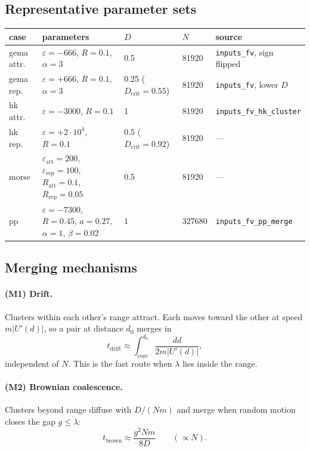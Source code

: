 \documentclass[11pt]{article}
\newcommand{\code}[1]{\texttt{#1}}
\begin{document}
\subsection{Representative parameter sets}\label{sec:params}
\begin{center}
\begin{tabularx}{\textwidth}{@{}l L l l L@{}}
\toprule
case & parameters & $D$ & $N$ & source \\
\midrule
gema attr. & $\varepsilon=-666$, $R=0.1$, $\alpha=3$ & 0.5 & 81920 & \code{inputs\_fv}, sign flipped \\
gema rep. & $\varepsilon=+666$, $R=0.1$, $\alpha=3$ & 0.25 ($D_{\mathrm{crit}}=0.55$) & 81920 & \code{inputs\_fv}, lower $D$ \\
hk attr. & $\varepsilon=-3000$, $R=0.1$ & 1 & 81920 & \code{inputs\_fv\_hk\_cluster} \\
hk rep. & $\varepsilon=+2\cdot10^4$, $R=0.1$ & 0.5 ($D_{\mathrm{crit}}=0.92$) & 81920 & --- \\
morse & $\varepsilon_{\mathrm{att}}=200$, $\varepsilon_{\mathrm{rep}}=100$, $R_{\mathrm{att}}=0.1$, $R_{\mathrm{rep}}=0.05$ & 0.5 & 81920 & --- \\
pp & $\varepsilon=-7300$, $R=0.45$, $a=0.27$, $\alpha=1$, $\beta=0.02$ & 1 & 327680 & \code{inputs\_fv\_pp\_merge} \\
\bottomrule
\end{tabularx}
\end{center}

\subsection{Merging mechanisms}
\paragraph{(M1) Drift.} Clusters within each other's range attract. Each moves
toward the other at speed $m|U'(d)|$, so a pair at distance $d_0$ merges in
\begin{equation}
  t_{\mathrm{drift}} \approx \int_{\text{core}}^{d_0}\frac{dd}{2m|U'(d)|},
\end{equation}
independent of $N$. This is the fast route when $\lambda$ lies inside the range.

\paragraph{(M2) Brownian coalescence.} Clusters beyond range diffuse with
$D/(Nm)$ and merge when random motion closes the gap $g\le\lambda$:
\begin{equation}
  t_{\mathrm{brown}} \approx \frac{g^2 N m}{8D} \qquad (\propto N).
\end{equation}
\end{document}
